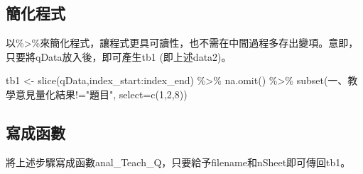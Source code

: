 \documentclass[
]{book}
\newenvironment{Shaded}{\begin{snugshade}}{\end{snugshade}}
\newcommand{\AttributeTok}[1]{\textcolor[rgb]{0.77,0.63,0.00}{#1}}
\newcommand{\DecValTok}[1]{\textcolor[rgb]{0.00,0.00,0.81}{#1}}
\newcommand{\FunctionTok}[1]{\textcolor[rgb]{0.00,0.00,0.00}{#1}}
\newcommand{\NormalTok}[1]{#1}
\newcommand{\OtherTok}[1]{\textcolor[rgb]{0.56,0.35,0.01}{#1}}
\newcommand{\SpecialCharTok}[1]{\textcolor[rgb]{0.00,0.00,0.00}{#1}}
\newcommand{\StringTok}[1]{\textcolor[rgb]{0.31,0.60,0.02}{#1}}
\begin{document}
\hypertarget{ux7c21ux5316ux7a0bux5f0f}{%
\subsection{簡化程式}\label{ux7c21ux5316ux7a0bux5f0f}}

以\%\textgreater\%來簡化程式，讓程式更具可讀性，也不需在中間過程多存出變項。意即，只要將qData放入後，即可產生tb1 (即上述data2)。

\begin{Shaded}
\begin{Highlighting}[]
\NormalTok{tb1 }\OtherTok{\textless{}{-}} \FunctionTok{slice}\NormalTok{(qData,index\_start}\SpecialCharTok{:}\NormalTok{index\_end) }\SpecialCharTok{\%\textgreater{}\%}
  \FunctionTok{na.omit}\NormalTok{() }\SpecialCharTok{\%\textgreater{}\%}
  \FunctionTok{subset}\NormalTok{(}\StringTok{\textasciigrave{}}\AttributeTok{一、教學意見量化結果}\StringTok{\textasciigrave{}}\SpecialCharTok{!=}\StringTok{"題目"}\NormalTok{, }\AttributeTok{select=}\FunctionTok{c}\NormalTok{(}\DecValTok{1}\NormalTok{,}\DecValTok{2}\NormalTok{,}\DecValTok{8}\NormalTok{))}
\end{Highlighting}
\end{Shaded}

\hypertarget{ux5bebux6210ux51fdux6578}{%
\subsection{寫成函數}\label{ux5bebux6210ux51fdux6578}}

將上述步驟寫成函數anal\_Teach\_Q，只要給予filename和nSheet即可傳回tb1。
\end{document}
